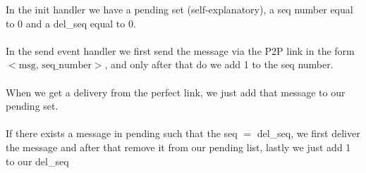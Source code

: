 \documentclass[11pt, a4paper]{article}
\begin{document}
In the init handler we have a pending set (self-explanatory), a seq number equal to 0 and a del\_seq equal to 0.\\\\
In the send event handler we first send the message via the P2P link in the form $<\text{msg, seq\_number}>$, and only after that do we add 1 to the seq number.\\\\
When we get a delivery from the perfect link, we just add that message to our pending set.\\\\
If there exists a message in pending such that the seq $=$ del\_seq, we first deliver the message and after that remove it from our pending list, lastly we just add 1 to our del\_seq\\\\
\end{document}
